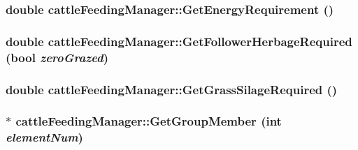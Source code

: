 \label{classcattle_feeding_manager_a58813fa005a5df26504c78c94c58ab0b}
\hypertarget{classcattle_feeding_manager_aff0a92836f05091db4b82ef3ddb6fbb5}{
\subsubsection[{GetEnergyRequirement}]{\setlength{\rightskip}{0pt plus 5cm}double cattleFeedingManager::GetEnergyRequirement ()}}
\label{classcattle_feeding_manager_aff0a92836f05091db4b82ef3ddb6fbb5}
\hypertarget{classcattle_feeding_manager_aa1f06485a79e16288f2c99bb85f078b0}{
\subsubsection[{GetFollowerHerbageRequired}]{\setlength{\rightskip}{0pt plus 5cm}double cattleFeedingManager::GetFollowerHerbageRequired (bool {\em zeroGrazed})}}
\label{classcattle_feeding_manager_aa1f06485a79e16288f2c99bb85f078b0}
\hypertarget{classcattle_feeding_manager_a695168c165996079ecd9f0735bb6de1e}{
\subsubsection[{GetGrassSilageRequired}]{\setlength{\rightskip}{0pt plus 5cm}double cattleFeedingManager::GetGrassSilageRequired ()}}
\label{classcattle_feeding_manager_a695168c165996079ecd9f0735bb6de1e}
\hypertarget{classcattle_feeding_manager_ade13c39fd50aca07ec357f1a3dbaff2f}{
\subsubsection[{GetGroupMember}]{$\ast$ cattleFeedingManager::GetGroupMember (int {\em elementNum})}}
